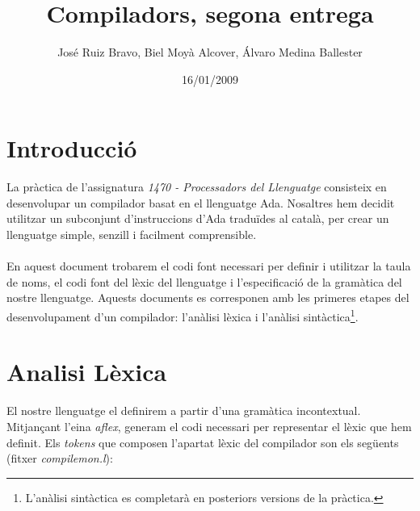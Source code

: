 \documentclass[10pt]{report}
\title{Compiladors, segona entrega}
\author{José Ruiz Bravo, Biel Moyà Alcover, Álvaro Medina Ballester}
\date{16/01/2009}
\begin{document}
    \maketitle
    \chapter{Introducció}
        La pràctica de l'assignatura \textit{1470 - Processadors del Llenguatge} consisteix en
        desenvolupar un compilador basat en el llenguatge Ada. Nosaltres hem decidit 
        utilitzar un subconjunt d'instruccions d'Ada traduïdes al català, per crear
        un llenguatge simple, senzill i facilment comprensible.
        \\
        \\
        En aquest document trobarem el codi font necessari per definir i utilitzar la
        taula de noms, el codi font del lèxic del llenguatge i l'especificació de la
        gramàtica del nostre llenguatge. Aquests documents es corresponen amb les primeres
        etapes del desenvolupament d'un compilador: l'anàlisi lèxica i l'anàlisi sintàctica\footnote{L'anàlisi sintàctica es completarà en posteriors versions de la pràctica.}.
    \newpage
    \chapter{Analisi Lèxica}
        El nostre llenguatge el definirem a partir d'una gramàtica incontextual. Mitjançant l'eina \textit{aflex}, generam el codi necessari per representar el lèxic que hem definit. Els \textit{tokens} que composen l'apartat lèxic del compilador son els següents (fitxer \textit{compilemon.l}):
        \\
    
\end{document}
